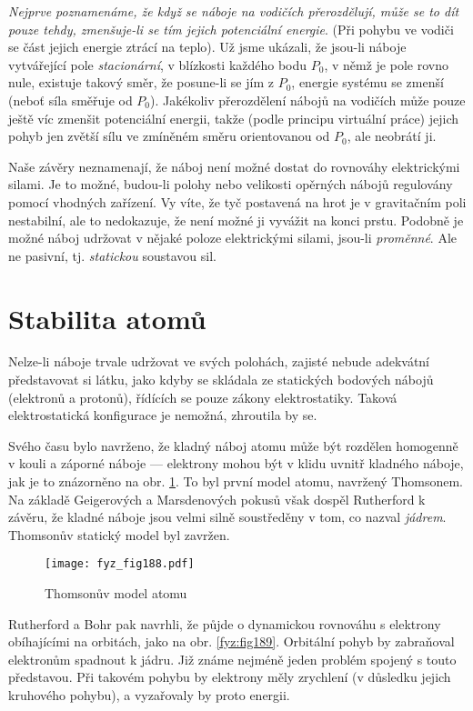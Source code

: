   \emph{Nejprve poznamenáme, že když se náboje na vodičích přerozdělují, může se to dít pouze 
  tehdy, zmenšuje-li se tím jejich potenciální energie}. (Při pohybu ve vodiči se část jejich 
  energie ztrácí na teplo). Už jsme ukázali, že jsou-li náboje vytvářející pole 
  \emph{stacionární}, v blízkosti každého bodu \(P_0\), v němž je pole rovno nule, existuje 
  takový směr, že posune-li se jím z \(P_0\), energie systému se zmenší (neboť síla směřuje od 
  \(P_0\)). Jakékoliv přerozdělení nábojů na vodičích může pouze ještě víc zmenšit potenciální 
  energii, takže (podle principu virtuální práce) jejich pohyb jen zvětší sílu ve zmíněném 
  směru orientovanou od \(P_0\), ale neobrátí ji.
  
  Naše závěry neznamenají, že náboj není možné dostat do rovnováhy elektrickými silami. Je to 
  možné, budou-li polohy nebo velikosti opěrných nábojů regulovány pomocí vhodných zařízení. Vy 
  víte, že tyč postavená na hrot je v gravitačním poli nestabilní, ale to nedokazuje, že není 
  možné ji vyvážit na konci prstu. Podobně je možné náboj udržovat v nějaké poloze elektrickými 
  silami, jsou-li \emph{proměnné}. Ale ne pasivní, tj. \emph{statickou} soustavou sil.

\section{Stabilita atomů}\label{fyz:IIchapVsecIII}
  Nelze-li náboje trvale udržovat ve svých polohách, zajisté nebude adekvátní představovat si 
  látku, jako kdyby se skládala ze statických bodových nábojů (elektronů a protonů), řídících 
  se pouze zákony elektrostatiky. Taková elektrostatická konfigurace je nemožná, zhroutila by 
  se.
  
  Svého času bylo navrženo, že kladný náboj atomu může být rozdělen homogenně v kouli a záporné 
  náboje — elektrony mohou být v klidu uvnitř kladného náboje, jak je to znázorněno na obr. 
  \ref{fyz:fig188}. To byl první model atomu, navržený Thomsonem. Na základě Geigerových a 
  Marsdenových pokusů však dospěl Rutherford k závěru, že kladné náboje jsou velmi silně 
  soustředěny v tom, co nazval \emph{jádrem}. Thomsonův statický model byl zavržen.
  \begin{figure}[ht!] %
    \centering
    \texttt{[image: fyz\_fig188.pdf]}
    \caption{Thomsonův model atomu}
    \label{fyz:fig188}
  \end{figure}
  
  Rutherford a Bohr pak navrhli, že půjde o dynamickou rovnováhu s elektrony obíhajícími na 
  orbitách, jako na obr. \ref{fyz:fig189}. Orbitální pohyb by zabraňoval 
  elektronům spadnout k jádru. Již známe nejméně jeden problém spojený s touto představou. Při 
  takovém pohybu by elektrony měly zrychlení (v důsledku jejich kruhového pohybu), a vyzařovaly 
  by proto energii.
  
